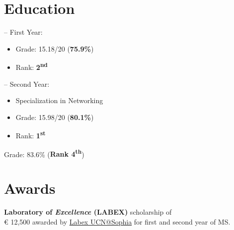 \documentclass[a4paper, bookmarks=false,hidelinks]{ms-resume} %
\begin{document}
%
\begin{minipage}[t]{0.27\textwidth} %


\section{Education} 

-- First Year: 
\begin{itemize}[leftmargin=6mm]
\setlength{\itemsep}{1pt}
\setlength{\parskip}{0pt}
\setlength{\parsep}{0pt}
\item Grade: 15.18/20 (\textbf{75.9\%})
\item {Rank: \textbf{2\textsuperscript{nd}}}\\
\end{itemize}
\vspace{-\topsep}

-- Second Year:
\vspace{-\topsep}
\begin{itemize}[leftmargin=6mm]
\setlength{\itemsep}{1pt}
\setlength{\parskip}{0pt}
\setlength{\parsep}{0pt}
\item  Specialization in Networking
\item Grade: 15.98/20 (\textbf{80.1\%})
\item {Rank: \textbf{1\textsuperscript{st}}}\\
\end{itemize}
\vspace{-\topsep}
\sectionspace %

Grade: 83.6\% ({\bf Rank 4\textsuperscript{th}})

\sectionspace %




\section{Awards}
\textbf{Laboratory of \textit{Excellence} (LABEX)} scholarship of \\ € 12,500 awarded by \href{http://ucnlab.eu/en/node/43}{Labex UCN@Sophia} for first and second year of MS.\\
\sectionspace %




\end{minipage}
\end{document}

